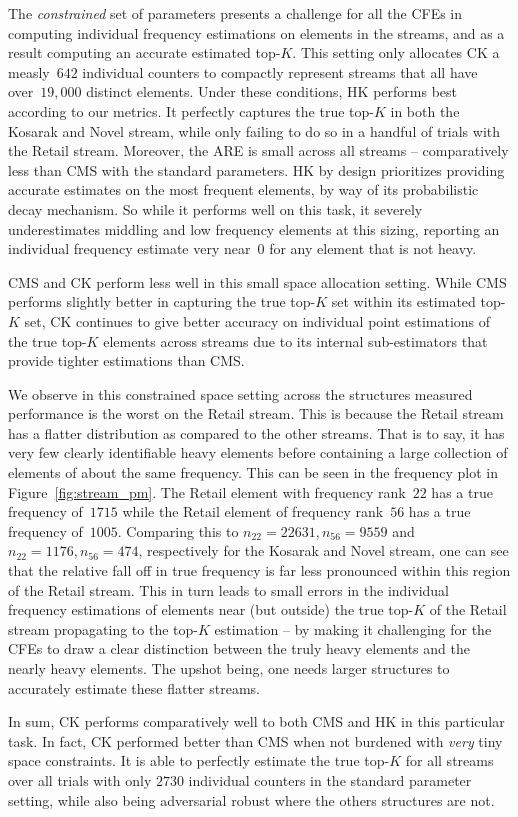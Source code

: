 The \emph{constrained} set of parameters presents a challenge for all the CFEs in computing individual frequency estimations on elements in the streams, and as a result computing an accurate estimated top-$K$. This setting only allocates CK a measly~$642$ individual counters to compactly represent streams that all have over~$19,000$ distinct elements. Under these conditions, HK performs best according to our metrics. It perfectly captures the true top-$K$ in both the Kosarak and Novel stream, while only failing to do so in a handful of trials with the Retail stream. Moreover, the ARE is small across all streams -- comparatively less than CMS with the standard parameters. HK by design prioritizes providing accurate estimates on the most frequent elements, by way of its probabilistic decay mechanism. So while it performs well on this task, it severely underestimates middling and low frequency elements at this sizing, reporting an individual frequency estimate very near~$0$ for any element that is not heavy. %

 CMS and CK perform less well in this small space allocation setting. While CMS performs slightly better in capturing the true top-$K$ set within its estimated top-$K$ set, CK continues to give better accuracy on individual point estimations of the true top-$K$ elements across streams due to its internal sub-estimators that provide tighter estimations than CMS.

We observe in this constrained space setting across the structures measured performance is the worst on the Retail stream. This is because the Retail stream has a flatter distribution as compared to the other streams. That is to say, it has very few clearly identifiable heavy elements before containing a large collection of elements of about the same frequency. This can be seen in the frequency plot in Figure~\ref{fig:stream_pm}. The Retail element with frequency rank~$22$ has a true frequency of~$1715$ while the Retail element of frequency rank~$56$ has a true frequency of~$1005$. Comparing this to $n_{22} = 22631, n_{56} = 9559$ and~$n_{22} = 1176, n_{56} = 474$, respectively for the Kosarak and Novel stream, one can see that the relative fall off in true frequency is far less pronounced within this region of the Retail stream. This in turn leads to small errors in the individual frequency estimations of elements near (but outside) the true top-$K$ of the Retail stream propagating to the top-$K$ estimation -- by making it challenging for the CFEs to draw a clear distinction between the truly heavy elements and the nearly heavy elements. The upshot being, one needs larger structures to accurately estimate these flatter streams.

In sum, CK performs comparatively well to both CMS and HK in this particular task. In fact, CK performed better than CMS when not burdened with \emph{very} tiny space constraints. It is able to perfectly estimate the true top-$K$ for all streams over all trials with only $2730$ individual counters in the standard parameter setting, while also being adversarial robust where the others structures are not. 

